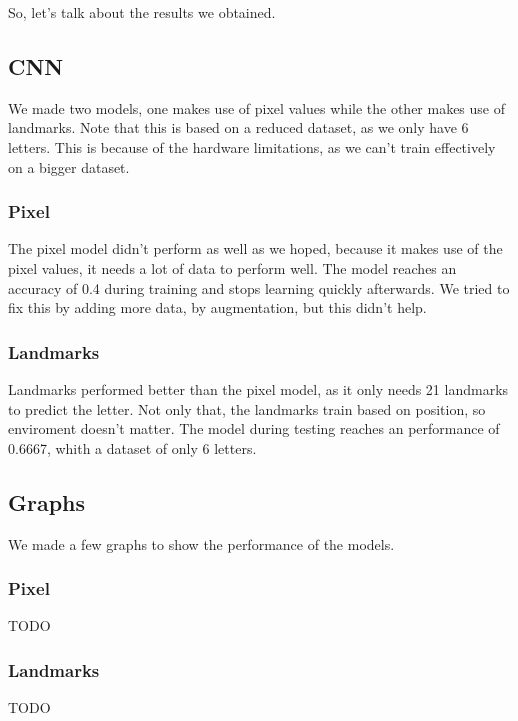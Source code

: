 \documentclass[../paper.tex]{subfiles}
\begin{document}
    So, let's talk about the results we obtained.
    \subsection{CNN}
    We made two models, one makes use of pixel values while the other makes use of landmarks.
    Note that this is based on a reduced dataset, as we only have 6 letters.
    This is because of the hardware limitations, as we can't train effectively on a bigger dataset.
    \subsubsection{Pixel}
    The pixel model didn't perform as well as we hoped, because it makes use of the pixel values, it needs a lot of data to perform well.
    The model reaches an accuracy of 0.4 during training and stops learning quickly afterwards.
    We tried to fix this by adding more data, by augmentation, but this didn't help.
    \subsubsection{Landmarks}
    Landmarks performed better than the pixel model, as it only needs 21 landmarks to predict the letter.
    Not only that, the landmarks train based on position, so enviroment doesn't matter.
    The model during testing reaches an performance of 0.6667, whith a dataset of only 6 letters.
    \subsection{Graphs}
    We made a few graphs to show the performance of the models.
    \subsubsection{Pixel}
    TODO
    \subsubsection{Landmarks}
    TODO
\end{document}
